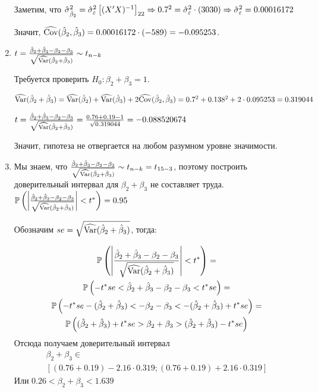 \begin{problem}
\begin{sol}
\begin{enumerate}
Заметим, что $\hat{\sigma}_{\hat{\beta}_2}^2 = \hat{\sigma}_{\varepsilon}^2 \left[ (X' X)^{-1} \right]_{22} \Rightarrow 0.7^2 = \hat{\sigma}_{\varepsilon}^2 \cdot (3030) \Rightarrow \hat{\sigma}_{\varepsilon}^2 = 0.00016172$

Значит, $\widehat{\operatorname{Cov}}(\hat{\beta}_2, \hat{\beta}_3) = 0.00016172 \cdot (-589) = -0.095253$.

\item $t = \frac{\hat{\beta}_2 + \hat{\beta}_3 - \beta_2 - \beta_3}{\sqrt{\widehat{\operatorname{Var}}(\hat{\beta}_2 + \hat{\beta}_3)}} \sim t_{n-k}$

Требуется проверить $H_0: \beta_2 + \beta_3 = 1$.

$\widehat{\operatorname{Var}}(\hat{\beta}_2 + \hat{\beta}_3) = \widehat{\operatorname{Var}}(\hat{\beta}_2) + \widehat{\operatorname{Var}}(\hat{\beta}_3) + 2\widehat{\operatorname{Cov}}(\hat{\beta}_2, \hat{\beta}_3) = 0.7^2 + 0.138^2 + 2 \cdot 0.095253 = 0.319044$

$t = \frac{\hat{\beta}_2 + \hat{\beta}_3 - \beta_2 - \beta_3}{\sqrt{\widehat{\operatorname{Var}}(\hat{\beta}_2 + \hat{\beta}_3)}} = \frac{0.76 + 0.19 - 1}{\sqrt{0.319044}} = -0.088520674$

Значит, гипотеза не отвергается на любом разумном уровне значимости.

\item Мы знаем, что $\frac{\hat{\beta}_2 + \hat{\beta}_3 - \beta_2 - \beta_3}{\sqrt{\widehat{\operatorname{Var}}(\hat{\beta}_2 + \hat{\beta}_3)}} \sim t_{n-k} = t_{15-3}$, поэтому построить доверительный интервал для $\beta_2 + \beta_3$ не составляет труда. $\mathbb{P} \left( \left| \frac{\hat{\beta}_2 + \hat{\beta}_3 - \beta_2 - \beta_3}{\sqrt{\widehat{\operatorname{Var}}(\hat{\beta}_2 + \hat{\beta}_3)}} \right| < t^* \right) = 0.95$

Обозначим $se=\sqrt{\widehat{\operatorname{Var}}(\hat{\beta}_2 + \hat{\beta}_3)}$, тогда:

\begin{multline*}
\mathbb{P} \left( \left| \frac{\hat{\beta}_2 + \hat{\beta}_3 - \beta_2 - \beta_3}{\sqrt{\widehat{\operatorname{Var}}(\hat{\beta}_2 + \hat{\beta}_3)}} \right| < t^* \right) = \\
\mathbb{P} \left( -t^* se < \hat{\beta}_2 + \hat{\beta}_3 - \beta_2 - \beta_3 < t^* se \right) = \\
\mathbb{P} \left( -t^*se  - (\hat{\beta}_2 + \hat{\beta}_3) < - \beta_2 - \beta_3  < -(\hat{\beta}_2 + \hat{\beta}_3) + t^* se \right) =\\
\mathbb{P} \left( (\hat{\beta}_2 + \hat{\beta}_3) + t^* se
> \beta_2 + \beta_3
> (\hat{\beta}_2 + \hat{\beta}_3) - t^* se \right)
\end{multline*}
Отсюда получаем доверительный интервал
\begin{multline*}
\beta_2 + \beta_3 \in \\
[(0.76 + 0.19) - 2.16 \cdot 0.319;  (0.76 + 0.19) + 2.16 \cdot 0.319 ]
\end{multline*}
Или $0.26< \beta_2 + \beta_3  < 1.639  $
\end{enumerate}
\end{sol}
\end{problem}



